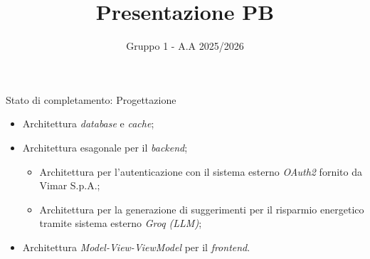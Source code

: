 \documentclass{beamer}
\title{Presentazione PB}
\author[]{Gruppo 1 - A.A 2025/2026}
\begin{document}
{
\begin{frame}
  \titlepage
\end{frame}
}

\begin{frame}{Stato di completamento: Progettazione}



  \begin{itemize}
    \item Architettura \textit{database} e \textit{cache};
          \vspace{0.55cm}
    \item Architettura esagonale per il \textit{backend};
          \begin{itemize}
            \vspace{0.2cm}
            \item Architettura per l'autenticazione con il sistema esterno \textit{OAuth2} fornito da Vimar S.p.A.;
                  \vspace{0.2cm}

            \item Architettura per la generazione di suggerimenti per il risparmio energetico tramite sistema esterno \textit{Groq (LLM)};
          \end{itemize}
          \vspace{0.55cm}
    \item Architettura \textit{Model-View-ViewModel} per il \textit{frontend}.
  \end{itemize}
\end{frame}
\end{document}
